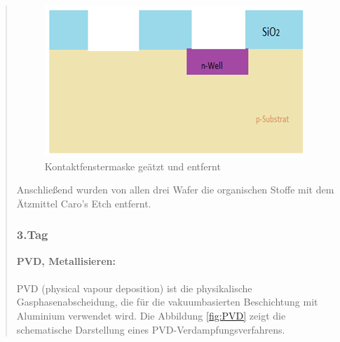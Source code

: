 \begin{quote}
    		\begin{figure}[H]
				\hspace{3 cm}
                  \includegraphics[scale=1, trim = 0cm 0cm 0cm 0cm,clip]
                	{./HerstellungBilder/KontaktfenstergeaetztundLackentfernt.png}
                  \caption{Kontaktfenstermaske geätzt und entfernt}
                \label{fig:Konfengeaetzt}
            \end{figure}

    		\vspace{2em}

			Anschließend wurden von allen drei Wafer die organischen Stoffe mit
			dem Ätzmittel Caro's Etch entfernt.



		\subsubsection{3.Tag}


		\textbf{PVD, Metallisieren:}\\
		\\
 		PVD (physical vapour deposition) ist die physikalische
 		Gasphasenabscheidung, die für die vakuumbasierten  Beschichtung mit
 		Aluminium verwendet wird. Die Abbildung \ref{fig:PVD} zeigt die schematische
 		Darstellung eines PVD-Verdampfungsverfahrens.

 		\vspace{2em}


\end{quote}
